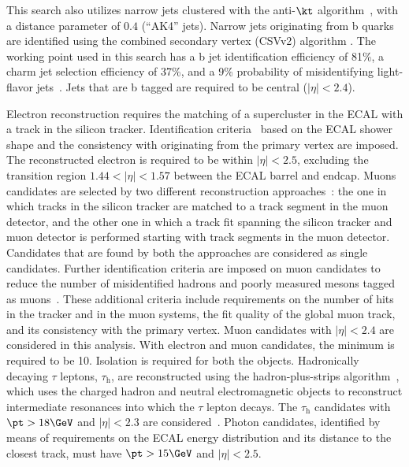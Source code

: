 This search also utilizes narrow jets clustered
with the anti-$\kt$ algorithm~\cite{Cacciari:2008gp}, with a distance
parameter of $0.4$ (“AK4” jets). Narrow jets originating from b quarks are identified using the combined secondary vertex (CSVv2) algorithm \cite{Sirunyan:2017ezt}. The working point used in this search has a b jet identification efficiency of 81\%, a charm jet selection efficiency of 37\%, and a 9\% probability of misidentifying light-flavor jets~\cite{Sirunyan:2017ezt}. Jets that are b tagged are required to be central ($|\eta|<2.4$).

Electron reconstruction requires the matching of a supercluster in the ECAL with a track in the silicon tracker.
Identification criteria~\cite{Khachatryan:2015hwa} based on the ECAL shower shape and the consistency with originating from the primary vertex are imposed. The reconstructed electron is required to be within $|\eta|< 2.5$, excluding the transition region $1.44<|\eta|<1.57$ between the ECAL barrel and endcap. Muons candidates are selected by two different reconstruction approaches~\cite{CMSMuonJINST}: the one in which tracks in the silicon tracker are matched to a track
 segment in the muon detector, and the other one in which a track
 fit spanning the silicon tracker and muon detector is performed
 starting with track segments in the muon detector. Candidates that are found by both the approaches are considered as single candidates.
Further identification criteria are imposed on muon candidates to reduce the number of misidentified hadrons and poorly measured mesons tagged as muons~\cite{CMSMuonJINST}. 
These additional criteria include requirements on the number of hits in the tracker and in the muon systems, the fit quality of the global muon track, and its consistency with the primary vertex.
Muon candidates with $|\eta|< 2.4$ are considered in this analysis. 
With electron and muon candidates, the minimum \pt is required to be 10\GeV. Isolation is required for both the objects.
Hadronically decaying $\tau$ leptons, $\tau_\mathrm{h}$, are reconstructed using the hadron-plus-strips
  algorithm~\cite{CMSTauJINST}, which uses the charged hadron and neutral electromagnetic objects 
to reconstruct intermediate resonances into which the $\tau$ lepton decays. The $\tau_\mathrm{h}$
candidates with $\pt>18\GeV$ and $|\eta|< 2.3$ are considered~\cite{Khachatryan:2015hwa,Chatrchyan:2013sba,CMSTauJINST}. Photon candidates, identified by means of requirements on the ECAL energy distribution and its distance to the closest track, must have $\pt>15\GeV$ and $|\eta|< 2.5$. %

